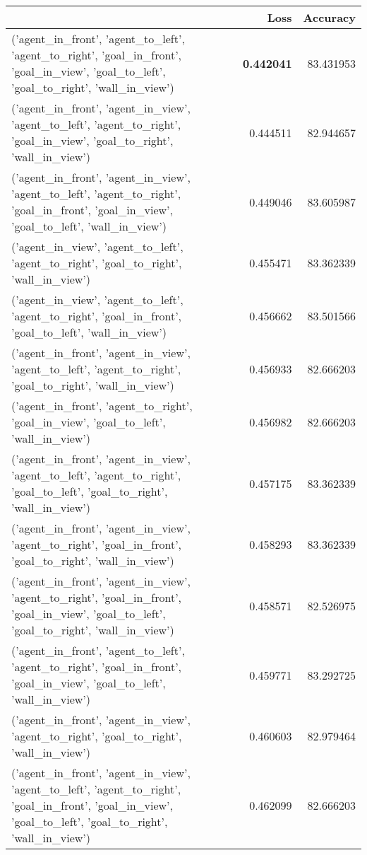 \begin{tabular}{lrr}
\toprule
 & Loss & Accuracy \\
\midrule
('agent\_in\_front', 'agent\_to\_left', 'agent\_to\_right', 'goal\_in\_front', 'goal\_in\_view', 'goal\_to\_left', 'goal\_to\_right', 'wall\_in\_view') & \color{f_darkred} \bfseries 0.442041 & 83.431953 \\
('agent\_in\_front', 'agent\_in\_view', 'agent\_to\_left', 'agent\_to\_right', 'goal\_in\_view', 'goal\_to\_right', 'wall\_in\_view') & 0.444511 & 82.944657 \\
('agent\_in\_front', 'agent\_in\_view', 'agent\_to\_left', 'agent\_to\_right', 'goal\_in\_front', 'goal\_in\_view', 'goal\_to\_left', 'wall\_in\_view') & 0.449046 & 83.605987 \\
('agent\_in\_view', 'agent\_to\_left', 'agent\_to\_right', 'goal\_to\_right', 'wall\_in\_view') & 0.455471 & 83.362339 \\
('agent\_in\_view', 'agent\_to\_left', 'agent\_to\_right', 'goal\_in\_front', 'goal\_to\_left', 'wall\_in\_view') & 0.456662 & 83.501566 \\
('agent\_in\_front', 'agent\_in\_view', 'agent\_to\_left', 'agent\_to\_right', 'goal\_to\_right', 'wall\_in\_view') & 0.456933 & 82.666203 \\
('agent\_in\_front', 'agent\_to\_right', 'goal\_in\_view', 'goal\_to\_left', 'wall\_in\_view') & 0.456982 & 82.666203 \\
('agent\_in\_front', 'agent\_in\_view', 'agent\_to\_left', 'agent\_to\_right', 'goal\_to\_left', 'goal\_to\_right', 'wall\_in\_view') & 0.457175 & 83.362339 \\
('agent\_in\_front', 'agent\_in\_view', 'agent\_to\_right', 'goal\_in\_front', 'goal\_to\_right', 'wall\_in\_view') & 0.458293 & 83.362339 \\
('agent\_in\_front', 'agent\_in\_view', 'agent\_to\_right', 'goal\_in\_front', 'goal\_in\_view', 'goal\_to\_left', 'goal\_to\_right', 'wall\_in\_view') & 0.458571 & 82.526975 \\
('agent\_in\_front', 'agent\_to\_left', 'agent\_to\_right', 'goal\_in\_front', 'goal\_in\_view', 'goal\_to\_left', 'wall\_in\_view') & 0.459771 & 83.292725 \\
('agent\_in\_front', 'agent\_in\_view', 'agent\_to\_right', 'goal\_to\_right', 'wall\_in\_view') & 0.460603 & 82.979464 \\
('agent\_in\_front', 'agent\_in\_view', 'agent\_to\_left', 'agent\_to\_right', 'goal\_in\_front', 'goal\_in\_view', 'goal\_to\_left', 'goal\_to\_right', 'wall\_in\_view') & 0.462099 & 82.666203 \\

\end{tabular}
